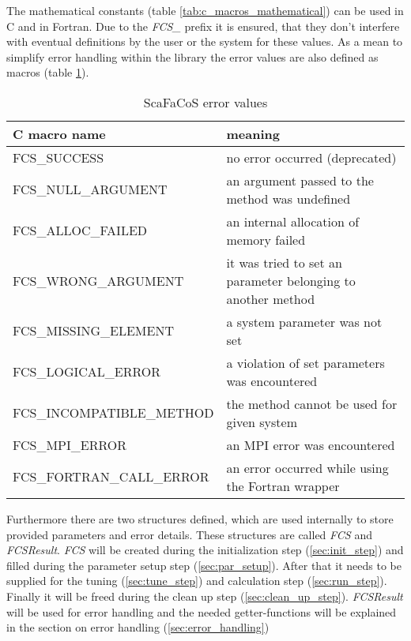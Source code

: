 The mathematical constants (table \ref{tab:c_macros_mathematical}) can be used in C and in Fortran. Due to the \textit{FCS\_} prefix it
is ensured, that they don't interfere with eventual definitions by the user or the system for these values. As a mean to simplify
error handling within the library the error values are also defined as macros (table \ref{tab:c_macros_error}).

\begin{table}
    \begin{center}
    \begin{tabular}{|l|p{}|}
        \hline
        C macro name                    &               meaning                                 \\
        \hline
        \hline
        FCS\_SUCCESS                    &       no error occurred (deprecated)                   \\
        \hline
        FCS\_NULL\_ARGUMENT             &       an argument passed to the method was undefined  \\
        \hline
        FCS\_ALLOC\_FAILED              &       an internal allocation of memory failed         \\
        \hline
        FCS\_WRONG\_ARGUMENT            &       it was tried to set an parameter belonging to
                                                another method                                  \\
        \hline
        FCS\_MISSING\_ELEMENT           &       a system parameter was not set                  \\
        \hline
        FCS\_LOGICAL\_ERROR             &       a violation of set parameters was encountered   \\
        \hline
        FCS\_INCOMPATIBLE\_METHOD       &       the method cannot be used for given system      \\
        \hline
        FCS\_MPI\_ERROR                 &       an MPI error was encountered                    \\
        \hline
        FCS\_FORTRAN\_CALL\_ERROR       &       an error occurred while using the Fortran wrapper\\
        \hline
    \end{tabular}
    \end{center}
    \caption{ScaFaCoS error values}
    \label{tab:c_macros_error}
\end{table}

Furthermore there are two structures defined, which are used internally to store provided parameters and
error details. These structures are called \textit{FCS} and \textit{FCSResult}. \textit{FCS} will be created
during the initialization step (\ref{sec:init_step}) and filled during the parameter setup step (\ref{sec:par_setup}).
After that it needs to be supplied for the tuning (\ref{sec:tune_step}) and calculation step (\ref{sec:run_step}).
Finally it will be freed during the clean up step (\ref{sec:clean_up_step}). \textit{FCSResult} will be
used for error handling and the needed getter-functions will be explained in the
section on error handling (\ref{sec:error_handling}) 

